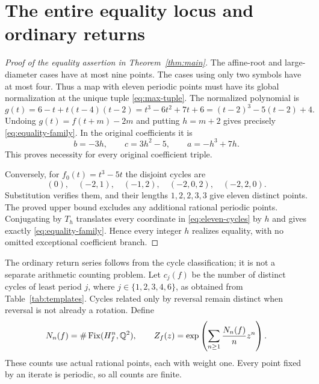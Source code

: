 \section{The entire equality locus and ordinary returns}
\label{sec:equality}

\begin{proof}[Proof of the equality assertion in Theorem~\ref{thm:main}]
The affine-root and large-diameter cases have at most nine points.
The cases using only two symbols have at most four.
Thus a map with eleven periodic points must have its global
normalization at the unique tuple \eqref{eq:max-tuple}.
The normalized polynomial is
\[
 g(t)=6-t+t(t-4)(t-2)
     =t^3-6t^2+7t+6
     =(t-2)^3-5(t-2)+4.
\]
Undoing $g(t)=f(t+m)-2m$ and putting $h=m+2$ gives precisely
\eqref{eq:equality-family}. In the original coefficients it is
\begin{equation}
 b=-3h,\qquad c=3h^2-5,\qquad a=-h^3+7h.
 \label{eq:equality-coefficients}
\end{equation}
This proves necessity for every original coefficient triple.

Conversely, for $f_0(t)=t^3-5t$ the disjoint cycles are
\begin{equation}
 (0),\quad(-2,1),\quad(-1,2),\quad
 (-2,0,2),\quad(-2,2,0).
 \label{eq:eleven-cycles}
\end{equation}
Substitution verifies them, and their lengths $1,2,2,3,3$ give
eleven distinct points. The proved upper bound excludes any
additional rational periodic points. Conjugating by $T_h$
translates every coordinate in \eqref{eq:eleven-cycles} by $h$
and gives exactly \eqref{eq:equality-family}.
Hence every integer $h$ realizes equality, with no omitted
exceptional coefficient branch.
\end{proof}

The ordinary return series follows from the cycle classification;
it is not a separate arithmetic counting problem. Let $c_j(f)$ be
the number of distinct cycles of least period $j$, where
$j\in\{1,2,3,4,6\}$, as obtained from Table~\ref{tab:templates}.
Cycles related only by reversal remain distinct when reversal is
not already a rotation. Define
\[
 N_n(f)=\#\operatorname{Fix}(H_f^n,\mathbb{Q}^2),\qquad
 Z_f(z)=\exp\left(\sum_{n\ge1}\frac{N_n(f)}{n}z^n\right).
\]
These counts use actual rational points, each with weight one.
Every point fixed by an iterate is periodic, so all counts are finite.

